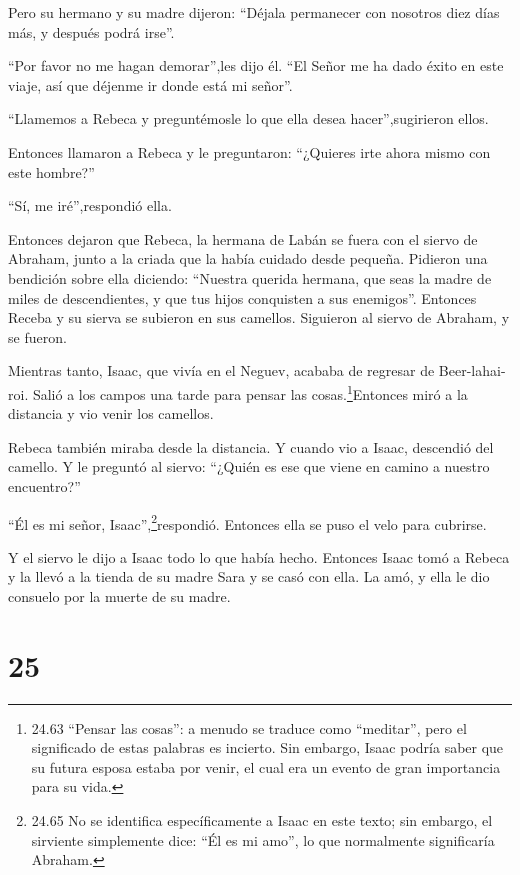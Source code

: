  Pero su hermano y su madre dijeron: ``Déjala permanecer
con nosotros diez días más, y después podrá irse''.

 ``Por favor no me hagan demorar'',les dijo él. ``El Señor
me ha dado éxito en este viaje, así que déjenme ir donde está mi
señor''.

 ``Llamemos a Rebeca y preguntémosle lo que ella desea
hacer'',sugirieron ellos.

 Entonces llamaron a Rebeca y le preguntaron: ``¿Quieres
irte ahora mismo con este hombre?''

``Sí, me iré'',respondió ella.

 Entonces dejaron que Rebeca, la hermana de Labán se fuera
con el siervo de Abraham, junto a la criada que la había cuidado desde
pequeña.  Pidieron una bendición sobre ella diciendo:
``Nuestra querida hermana, que seas la madre de miles de descendientes,
y que tus hijos conquisten a sus enemigos''.  Entonces
Receba y su sierva se subieron en sus camellos. Siguieron al siervo de
Abraham, y se fueron.

 Mientras tanto, Isaac, que vivía en el Neguev, acababa de
regresar de Beer-lahai-roi.  Salió a los campos una tarde
para pensar las cosas.\footnote{24.63 ``Pensar las cosas'': a menudo se
  traduce como ``meditar'', pero el significado de estas palabras es
  incierto. Sin embargo, Isaac podría saber que su futura esposa estaba
  por venir, el cual era un evento de gran importancia para su vida.}Entonces
miró a la distancia y vio venir los camellos.

 Rebeca también miraba desde la distancia. Y cuando vio a
Isaac, descendió del camello.  Y le preguntó al siervo:
``¿Quién es ese que viene en camino a nuestro encuentro?''

``Él es mi señor, Isaac'',\footnote{24.65 No se identifica
  específicamente a Isaac en este texto; sin embargo, el sirviente
  simplemente dice: ``Él es mi amo'', lo que normalmente significaría
  Abraham.}respondió. Entonces ella se puso el velo para cubrirse.

 Y el siervo le dijo a Isaac todo lo que había hecho.
 Entonces Isaac tomó a Rebeca y la llevó a la tienda de su
madre Sara y se casó con ella. La amó, y ella le dio consuelo por la
muerte de su madre.

\hypertarget{section-24}{%
\section{25}\label{section-24}}

